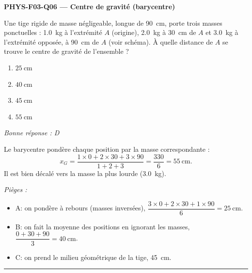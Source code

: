 \documentclass[11pt,a4paper]{article}
\begin{document}
\noindent\textbf{PHYS-F03-Q06 --- Centre de gravité (barycentre)}\par
Une tige rigide de masse négligeable, longue de \qty{90}{\centi\metre}, porte trois masses ponctuelles :
\qty{1.0}{\kilogram} à l'extrémité $A$ (origine), \qty{2.0}{\kilogram} à \qty{30}{\centi\metre} de $A$ et
\qty{3.0}{\kilogram} à l'extrémité opposée, à \qty{90}{\centi\metre} de $A$ (voir schéma). À quelle
distance de $A$ se trouve le centre de gravité de l'ensemble ?
\begin{center}
\end{center}
\begin{enumerate}[label=\Alph*)]
\item $\qty{25}{\centi\metre}$
\item $\qty{40}{\centi\metre}$
\item $\qty{45}{\centi\metre}$
\item $\qty{55}{\centi\metre}$
\end{enumerate}
\textit{Bonne réponse : D}\par
Le barycentre pondère chaque position par la masse correspondante :
\[ x_G = \frac{1\times 0 + 2\times 30 + 3\times 90}{1+2+3} = \frac{330}{6} = \qty{55}{\centi\metre}. \]
Il est bien décalé vers la masse la plus lourde (\qty{3.0}{\kilogram}).\par
\textit{Pièges :}
\begin{itemize}
\item A: on pondère à rebours (masses inversées), $\dfrac{3\times 0 + 2\times 30 + 1\times 90}{6} = \qty{25}{\centi\metre}$.
\item B: on fait la moyenne des positions en ignorant les masses, $\dfrac{0+30+90}{3} = \qty{40}{\centi\metre}$.
\item C: on prend le milieu géométrique de la tige, \qty{45}{\centi\metre}.
\end{itemize}
\vspace{8pt}\hrule\vspace{8pt}
\end{document}
